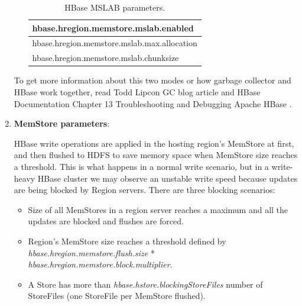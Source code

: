 \begin{enumerate}
\begin{enumerate}
\par
\begin{table}[htbp]
\begin{center}
\begin{tabular}{|l|}
\hline
hbase.hregion.memstore.mslab.enabled  \\ \hline
hbase.hregion.memstore.mslab.max.allocation \\ \hline
hbase.hregion.memstore.mslab.chunksize \\ \hline
\end{tabular}
\label{HBase MSLAB parameters.}
\caption{HBase MSLAB parameters.}
\end{center}
\end{table}

\end{enumerate}


To get more information about this two modes or how garbage collector and HBase work together, read Todd Lipcon GC blog article \cite{MSLABexplained} and HBase Documentation Chapter 13 Troubleshooting and Debugging Apache HBase \cite{ApacheHBaseLogs}.

\item \textbf{MemStore parameters}:
\par
HBase write operations are applied in the hosting region's MemStore at first, and then flushed to HDFS to save memory space when MemStore size reaches a threshold. This is what happens in a normal write scenario, but in a write-heavy HBase cluster we may observe an unstable write speed because updates are being blocked by Region servers. There are three blocking scenarios:
\begin{itemize}
\item Size of all MemStores in a region server reaches a maximum and all the updates are blocked and flushes are forced.
\item Region's MemStore size reaches a threshold defined by \textit{hbase.hregion.memstore.flush.size} * \textit{hbase.hregion.memstore.block.multiplier}.
\item A Store has more than \textit{hbase.hstore.blockingStoreFiles} number of StoreFiles (one StoreFile per MemStore flushed).
\end{itemize}


\end{enumerate}
